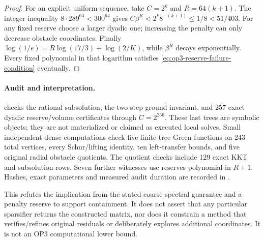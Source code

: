 \begin{proof}
For an explicit uniform sequence, take $C=2^k$ and $R=64(k+1)$.
The integer inequality $8\cdot289^{64}<300^{64}$ gives
$C\beta^R<2^k8^{-(k+1)}\leq1/8<51/403$.
For any fixed reserve choose a larger dyadic one; increasing the penalty
can only decrease obstacle coordinates. Finally
$\log(1/e)=R\log(17/3)+\log(2/K)$, while $\beta^R$ decays
exponentially. Every fixed polynomial in that logarithm satisfies
\cref{eq:op3-reserve-failure-condition} eventually.
\end{proof}

\paragraph{Audit and interpretation.}
 checks the rational subsolution,
the two-step ground invariant, and 257 exact dyadic reserve/volume
certificates through $C=2^{256}$. These last trees are symbolic objects;
they are not materialized or claimed as executed local solves. Small
independent dense computations check five finite-tree Green functions
on 243 total vertices, every Schur/lifting identity, ten left-transfer
bounds, and five original radial obstacle quotients. The quotient checks
include 129 exact KKT and subsolution rows. Seven further witnesses use
reserves polynomial in $R+1$.
Hashes, exact parameters and measured audit duration are recorded in
.

This refutes the implication from the stated coarse spectral guarantee
and a penalty reserve to support containment. It does not assert that any
particular sparsifier returns the constructed matrix, nor does it constrain
a method that verifies/refines original residuals or deliberately explores
additional coordinates. It is not an OP3 computational lower bound.
